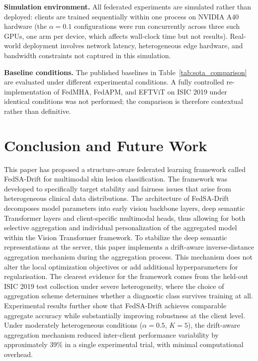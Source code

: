\documentclass[utf8]{FrontiersinHarvard} %
\newcommand{\sadrift}{FedSA-Drift}
\begin{document}
\textbf{Simulation environment.} All federated experiments are simulated rather than deployed: clients are trained sequentially within one process on NVIDIA A40 hardware (the $\alpha{=}0.1$ configurations were run concurrently across three such GPUs, one arm per device, which affects wall-clock time but not results). Real-world deployment involves network latency, heterogeneous edge hardware, and bandwidth constraints not captured in this simulation.

\textbf{Baseline conditions.} The published baselines in Table~\ref{tab:sota_comparison} are evaluated under different experimental conditions. A fully controlled re-implementation of FedMHA, FedAPM, and EFTViT on ISIC 2019 under identical conditions was not performed; the comparison is therefore contextual rather than definitive.

\section{Conclusion and Future Work}

This paper has proposed a structure-aware federated learning framework called \sadrift{} for multimodal skin lesion classification. The framework was developed to specifically target stability and fairness issues that arise from heterogeneous clinical data distributions. The architecture of \sadrift{} decomposes model parameters into early vision backbone layers, deep semantic Transformer layers and client-specific multimodal heads, thus allowing for both selective aggregation and individual personalization of the aggregated model within the Vision Transformer framework. To stabilize the deep semantic representations at the server, this paper implements a drift-aware inverse-distance aggregation mechanism during the aggregation process. This mechanism does not alter the local optimization objectives or add additional hyperparameters for regularisation. The clearest evidence for the framework comes from the held-out ISIC 2019 test collection under severe heterogeneity, where the choice of aggregation scheme determines whether a diagnostic class survives training at all. Experimental results further show that \sadrift{} achieves comparable aggregate accuracy while substantially improving robustness at the client level. Under moderately heterogeneous conditions ($\alpha = 0.5$, $K = 5$), the drift-aware aggregation mechanism reduced inter-client performance variability by approximately 39\% in a single experimental trial, with minimal computational overhead.
\end{document}
